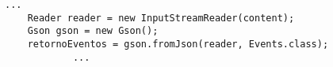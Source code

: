 \begin{lstlisting}[style=custom_JAVA]
			...
	Reader reader = new InputStreamReader(content);
    Gson gson = new Gson();
    retornoEventos = gson.fromJson(reader, Events.class);
			...
\end{lstlisting}